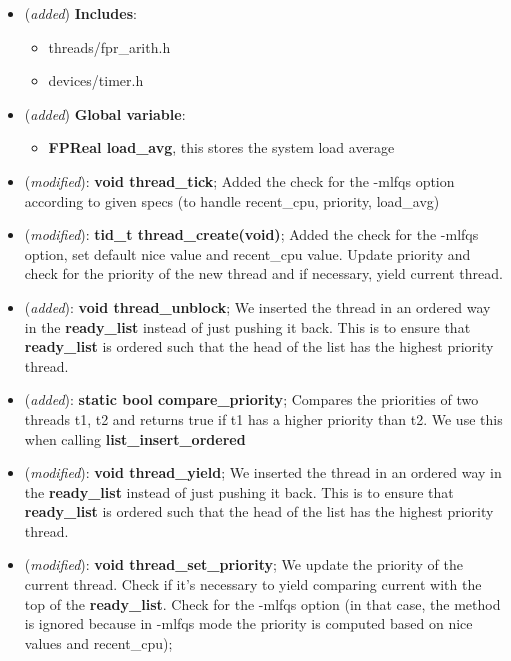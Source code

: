 \documentclass[11pt]{scrartcl}
\begin{document}
\begin{itemize}
    \item (\textit{added}) \textbf{Includes}:
    \begin{itemize}
        \item threads/fpr\_arith.h
        \item devices/timer.h
    \end{itemize}
    \item (\textit{added}) \textbf{Global variable}:
    \begin{itemize}
    \item \textbf{FPReal load\_avg}, this stores the system load average
    \end{itemize}
    
    \item (\textit{modified}): \textbf{void thread\_tick}; Added the check for the -mlfqs option according to given specs (to handle recent\_cpu, priority, load\_avg)
    
    \item (\textit{modified}): \textbf{tid\_t thread\_create(void)};
    Added the check for the -mlfqs option, set default nice value and recent\_cpu value. Update priority and check for the priority of the new thread and if necessary, yield current thread.

    \item (\textit{added}): \textbf{void thread\_unblock};
    We inserted the thread in an ordered way in the \textbf{ready\_list} instead of just pushing it back. This is to ensure that \textbf{ready\_list} is ordered such that the head of the list has the highest priority thread.

    \item (\textit{added}): \textbf{static bool compare\_priority};
    Compares the priorities of two threads t1, t2 and returns true if t1 has a higher priority than t2. We use this when calling \textbf{list\_insert\_ordered}
    
    
    \item (\textit{modified}): \textbf{void thread\_yield};
    We inserted the thread in an ordered way in the \textbf{ready\_list} instead of just pushing it back. This is to ensure that \textbf{ready\_list} is ordered such that the head of the list has the highest priority thread.

    \item (\textit{modified}): \textbf{void thread\_set\_priority};
    We update the priority of the current thread. Check if it's necessary to yield comparing current with the top of the \textbf{ready\_list}. Check for the -mlfqs option (in that case, the method is ignored because in -mlfqs mode the priority is computed based on nice values and recent\_cpu);


\end{itemize}
\end{document}
